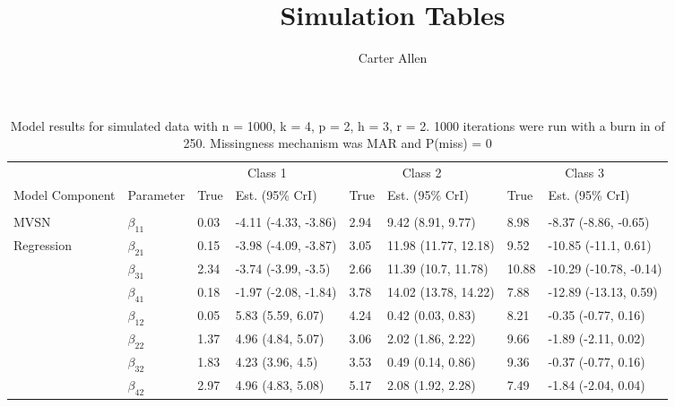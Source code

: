 \documentclass[]{article}
\title{Simulation Tables}
\author{Carter Allen}
\date{}
\begin{document}
\maketitle

\begin{table}[t]

\caption{\label{tab:unnamed-chunk-5}Model results for simulated data with n = 1000, k = 4, p = 2, h = 3, r = 2. 1000 iterations were run with a burn in of 250. Missingness mechanism was MAR and P(miss) = 0}
\centering
\fontsize{8}{10}\selectfont
\begin{tabular}{llllllll}
\toprule
\multicolumn{2}{c}{ } & \multicolumn{2}{c}{Class 1} & \multicolumn{2}{c}{Class 2} & \multicolumn{2}{c}{Class 3} \\
\cmidrule(l{3pt}r{3pt}){3-4} \cmidrule(l{3pt}r{3pt}){5-6} \cmidrule(l{3pt}r{3pt}){7-8}
Model Component & Parameter & True & Est. (95\% CrI) & True & Est. (95\% CrI) & True & Est. (95\% CrI)\\
\midrule
\addlinespace[0.3em]
\multicolumn{8}{l}{\textbf{ }}\\
\hspace{1em}MVSN & $\beta_{11}$ & 0.03 & -4.11 (-4.33, -3.86) & 2.94 & 9.42 (8.91, 9.77) & 8.98 & -8.37 (-8.86, -0.65)\\
\hspace{1em}Regression & $\beta_{21}$ & 0.15 & -3.98 (-4.09, -3.87) & 3.05 & 11.98 (11.77, 12.18) & 9.52 & -10.85 (-11.1, 0.61)\\
\hspace{1em} & $\beta_{31}$ & 2.34 & -3.74 (-3.99, -3.5) & 2.66 & 11.39 (10.7, 11.78) & 10.88 & -10.29 (-10.78, -0.14)\\
\hspace{1em} & $\beta_{41}$ & 0.18 & -1.97 (-2.08, -1.84) & 3.78 & 14.02 (13.78, 14.22) & 7.88 & -12.89 (-13.13, 0.59)\\
\hspace{1em} & $\beta_{12}$ & 0.05 & 5.83 (5.59, 6.07) & 4.24 & 0.42 (0.03, 0.83) & 8.21 & -0.35 (-0.77, 0.16)\\
\hspace{1em} & $\beta_{22}$ & 1.37 & 4.96 (4.84, 5.07) & 3.06 & 2.02 (1.86, 2.22) & 9.66 & -1.89 (-2.11, 0.02)\\
\hspace{1em} & $\beta_{32}$ & 1.83 & 4.23 (3.96, 4.5) & 3.53 & 0.49 (0.14, 0.86) & 9.36 & -0.37 (-0.77, 0.16)\\
\hspace{1em} & $\beta_{42}$ & 2.97 & 4.96 (4.83, 5.08) & 5.17 & 2.08 (1.92, 2.28) & 7.49 & -1.84 (-2.04, 0.04)\\

\end{tabular}
\end{table}
\end{document}
